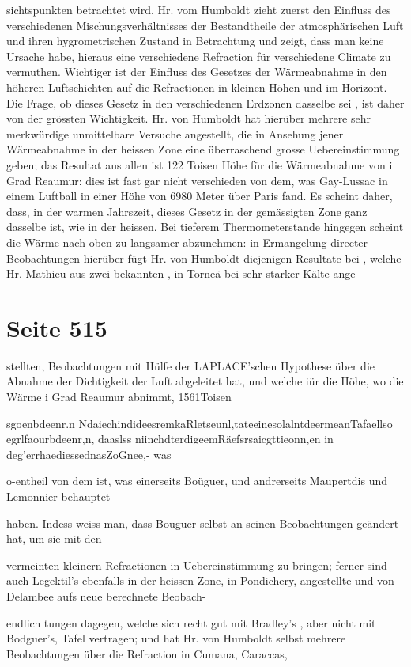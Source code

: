 \documentclass[10pt,a4paper]{article}
\begin{document}
sichtspunkten betrachtet wird. Hr. vom Humboldt zieht zuerst den Einfluss des verschiedenen Mischungsverhältnisses der Bestandtheile der atmosphärischen Luft und ihren hygrometrischen Zustand in Betrachtung und zeigt, dass man keine Ursache habe, hieraus eine verschiedene Refraction für verschiedene Climate zu vermuthen. Wichtiger ist der Einfluss des Gesetzes der Wärmeabnahme in den höheren Luftschichten auf die Refractionen in kleinen Höhen und im Horizont. Die Frage, ob dieses Gesetz in den verschiedenen Erdzonen dasselbe sei , ist daher von der grössten Wichtigkeit. Hr. von Humboldt hat hierüber mehrere sehr merkwürdige unmittelbare Versuche angestellt, die in Ansehung jener Wärmeabnahme in der heissen Zone eine überraschend grosse Uebereinstimmung geben; das Resultat aus allen ist 122 Toisen Höhe für die Wärmeabnahme von i Grad Reaumur: dies ist fast gar nicht verschieden von dem, was Gay-Lussac in einem Luftball in einer Höhe von 6980 Meter über Paris fand. Es scheint daher, dass, in der warmen Jahrszeit, dieses Gesetz in der gemässigten Zone ganz dasselbe ist, wie in der heissen. Bei tieferem Thermometerstande hingegen scheint die Wärme nach oben zu langsamer abzunehmen: in Ermangelung directer Beobachtungen hierüber fügt Hr. von Humboldt diejenigen Resultate bei , welche Hr. Mathieu aus zwei bekannten , in Torneä bei sehr starker Kälte ange-


\newpage
\section*{Seite 515}
stellten, Beobachtungen mit Hülfe der LAPLACE'schen Hypothese über die Abnahme der Dichtigkeit der Luft abgeleitet hat, und welche iür die Höhe, wo die Wärme i Grad Reaumur abnimmt, 1561Toisen

sgoenbdeenr.n NdaiechindideesremkaRletseunl,tateeinesolalntdeermeanTafaellso egrlfaourbdeenr,n, daaslss niinchdterdigeemRäefsrsaicgttieonn,en in deg'errhaediessednasZoGnee,- was

o-entheil von dem ist, was einerseits Boüguer, und andrerseits Maupertdis und Lemonnier behauptet

haben. Indess weiss man, dass Bouguer selbst an seinen Beobachtungen geändert hat, um sie mit den

vermeinten kleinern Refractionen in Uebereinstimmung zu bringen; ferner sind auch Legektil's ebenfalls in der heissen Zone, in Pondichery, angestellte und von Delambee aufs neue berechnete Beobach-

endlich tungen dagegen, welche sich recht gut mit Bradley's , aber nicht mit Bodguer's, Tafel vertragen; und hat Hr. von Humboldt selbst mehrere Beobachtungen über die Refraction in Cumana, Caraccas,
\end{document}
